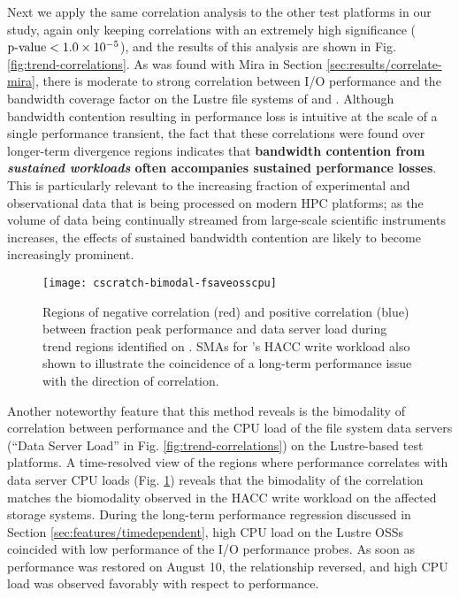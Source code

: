 Next we apply the same correlation analysis to the other test platforms in our study, again only keeping correlations with an extremely high significance ($\textup{p-value} < {1.0 \times 10^{-5}}$), and the results of this analysis are shown in Fig. \ref{fig:trend-correlations}.
As was found with Mira in Section \ref{sec:results/correlate-mira}, there is moderate to strong correlation between I/O performance and the bandwidth coverage factor on the Lustre file systems of \cori and \edison.
Although bandwidth contention resulting in performance loss is intuitive at the scale of a single performance transient, the fact that these correlations were found over longer-term divergence regions indicates that \textbf{bandwidth contention from \emph{sustained workloads} often accompanies sustained performance losses}.
This is particularly relevant to the increasing fraction of experimental and observational data that is being processed on modern HPC platforms; as the volume of data being continually streamed from large-scale scientific instruments increases, the effects of sustained bandwidth contention are likely to become increasingly prominent.


\begin{figure}
    \centering
    \texttt{[image: cscratch-bimodal-fsaveosscpu]}
    \vspace{-.35in}
    \caption{Regions of negative correlation (red) and positive correlation (blue) between fraction peak performance and data server load during trend regions identified on \cori.
    SMAs for \cori's HACC write workload also shown to illustrate the coincidence of a long-term performance issue with the direction of correlation.}
    \label{fig:cscratch-bimodal-fsaveosscpu}
\end{figure}


Another noteworthy feature that this method reveals is the bimodality of correlation between performance and the CPU load of the file system data servers (``Data Server Load'' in Fig. \ref{fig:trend-correlations}) on the Lustre-based test platforms.
A time-resolved view of the regions where performance correlates with data server CPU loads (Fig. \ref{fig:cscratch-bimodal-fsaveosscpu}) reveals that the bimodality of the correlation matches the biomodality observed in the HACC write workload on the affected storage systems.
During the long-term performance regression discussed in Section \ref{sec:features/timedependent}, high CPU load on the Lustre OSSs coincided with low performance of the I/O performance probes.
As soon as performance was restored on August 10, the relationship reversed, and high CPU load was observed favorably with respect to performance.

